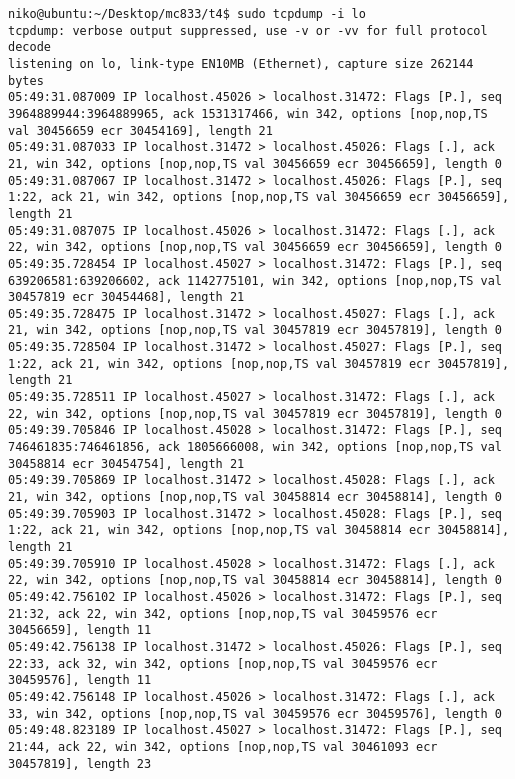 \documentclass[a4paper,10pt]{article}
\begin{document}
\begin{lstlisting}
niko@ubuntu:~/Desktop/mc833/t4$ sudo tcpdump -i lo
tcpdump: verbose output suppressed, use -v or -vv for full protocol decode
listening on lo, link-type EN10MB (Ethernet), capture size 262144 bytes
05:49:31.087009 IP localhost.45026 > localhost.31472: Flags [P.], seq 3964889944:3964889965, ack 1531317466, win 342, options [nop,nop,TS val 30456659 ecr 30454169], length 21
05:49:31.087033 IP localhost.31472 > localhost.45026: Flags [.], ack 21, win 342, options [nop,nop,TS val 30456659 ecr 30456659], length 0
05:49:31.087067 IP localhost.31472 > localhost.45026: Flags [P.], seq 1:22, ack 21, win 342, options [nop,nop,TS val 30456659 ecr 30456659], length 21
05:49:31.087075 IP localhost.45026 > localhost.31472: Flags [.], ack 22, win 342, options [nop,nop,TS val 30456659 ecr 30456659], length 0
05:49:35.728454 IP localhost.45027 > localhost.31472: Flags [P.], seq 639206581:639206602, ack 1142775101, win 342, options [nop,nop,TS val 30457819 ecr 30454468], length 21
05:49:35.728475 IP localhost.31472 > localhost.45027: Flags [.], ack 21, win 342, options [nop,nop,TS val 30457819 ecr 30457819], length 0
05:49:35.728504 IP localhost.31472 > localhost.45027: Flags [P.], seq 1:22, ack 21, win 342, options [nop,nop,TS val 30457819 ecr 30457819], length 21
05:49:35.728511 IP localhost.45027 > localhost.31472: Flags [.], ack 22, win 342, options [nop,nop,TS val 30457819 ecr 30457819], length 0
05:49:39.705846 IP localhost.45028 > localhost.31472: Flags [P.], seq 746461835:746461856, ack 1805666008, win 342, options [nop,nop,TS val 30458814 ecr 30454754], length 21
05:49:39.705869 IP localhost.31472 > localhost.45028: Flags [.], ack 21, win 342, options [nop,nop,TS val 30458814 ecr 30458814], length 0
05:49:39.705903 IP localhost.31472 > localhost.45028: Flags [P.], seq 1:22, ack 21, win 342, options [nop,nop,TS val 30458814 ecr 30458814], length 21
05:49:39.705910 IP localhost.45028 > localhost.31472: Flags [.], ack 22, win 342, options [nop,nop,TS val 30458814 ecr 30458814], length 0
05:49:42.756102 IP localhost.45026 > localhost.31472: Flags [P.], seq 21:32, ack 22, win 342, options [nop,nop,TS val 30459576 ecr 30456659], length 11
05:49:42.756138 IP localhost.31472 > localhost.45026: Flags [P.], seq 22:33, ack 32, win 342, options [nop,nop,TS val 30459576 ecr 30459576], length 11
05:49:42.756148 IP localhost.45026 > localhost.31472: Flags [.], ack 33, win 342, options [nop,nop,TS val 30459576 ecr 30459576], length 0
05:49:48.823189 IP localhost.45027 > localhost.31472: Flags [P.], seq 21:44, ack 22, win 342, options [nop,nop,TS val 30461093 ecr 30457819], length 23

\end{lstlisting}
\end{document}
